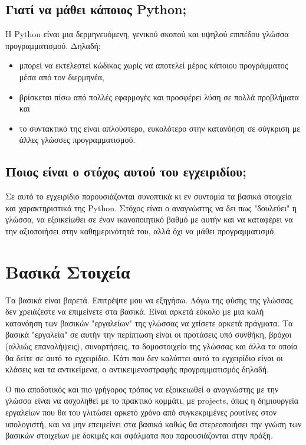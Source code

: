 \documentclass[14pt]{extreport}
\begin{document}
\section{Γιατί να μάθει κάποιος Python;}

Η Python είναι μια δερμηνευόμενη, γενικού σκοπού και υψηλού επιπέδου γλώσσα
προγραμματισμού. Δηλαδή:
\begin{itemize}
    \itemsep0cm
    \item μπορεί να εκτελεστεί κώδικας χωρίς να αποτελεί μέρος κάποιου προγράμματος μέσα από τον διερμηνέα,
    \item βρίσκεται πίσω από πολλές εφαρμογές και προσφέρει λύση σε πολλά
          προβλήματα και
    \item το συντακτικό της είναι απλούστερο, ευκολότερο στην κατανόηση σε
          σύγκριση με άλλες γλώσσες προγραμματισμού.
\end{itemize}

\section{Ποιος είναι ο στόχος αυτού του εγχειριδίου;}

Σε αυτό το εγχειρίδιο παρουσιάζονται συνοπτικά κι εν συντομία τα βασικά στοιχεία και χαρακτηριστικά της Python. Στόχος είναι ο αναγνώστης να δει πως "δουλεύει" η γλώσσα, να εξοικείωθει σε έναν ικανοποιητικό βαθμό με αυτήν και να καταφέρει να την αξιοποιήσει στην καθημερινότητά του, αλλά όχι να μάθει προγραμματισμό.


\chapter{Βασικά Στοιχεία}

Τα βασικά είναι βαρετά. Επιτρέψτε μου να εξηγήσω. Λόγω της φύσης της γλώσσας δεν χρειάζεστε να επιμείνετε στα βασικά. Είναι αρκετά εύκολο με μια καλή κατανόηση των βασικών "εργαλείων" της γλώσσας να χτίσετε αρκετά πράγματα. Τα βασικά "εργαλεία" σε αυτήν την περίπτωση είναι οι προτάσεις υπό συνθήκη, βρόχοι (αλλιώς επαναλήψεις), συναρτήσεις, τα δομοστοιχεία της γλώσσας και άλλα τα οποία θα δείτε σε αυτό το εγχειρίδιο. Κάτι που δεν καλύπτει αυτό το εγχειρίδιο είναι οι κλάσεις και τα αντικείμενα, ο αντικειμενοστραφής προγραμματισμός δηλαδή. 

Ο πιο αποδοτικός και πιο γρήγορος τρόπος να εξοικειωθεί ο αναγνώστης με την γλώσσα είναι να ασχοληθεί με το πρακτικό κομμάτι, με projects, όπως η δημιουργεία εργαλείων που θα του γλιτώσει αρκετό χρόνο από συγκεκριμένες ρουτίνες στον υπολογιστή, και να μην επειμείνει στα βασικά καθώς θα στερεοποιήσει την γνώση των βασικών στοιχείων με δοκιμές και σφάλματα που παρουσιάζονται στην πράξη.
\end{document}
